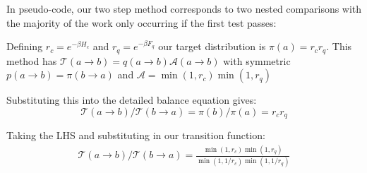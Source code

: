 In pseudo-code, our two step method corresponds to two nested comparisons with the majority of the work only occurring if the first test passes:

\begin{Shaded}
\begin{Highlighting}[]
\OperatorTok{=}

 
\OperatorTok{=}

\OperatorTok{=}
  \NormalTok{,}\NormalTok{) }\OperatorTok{\textless{}}\OperatorTok{{-}}\OperatorTok{*}
\OperatorTok{=}
    \NormalTok{,}\NormalTok{) }\OperatorTok{\textless{}}\OperatorTok{{-}}\OperatorTok{*}
\OperatorTok{=}

\OperatorTok{=}
\end{Highlighting}
\end{Shaded}

Defining \(r_c = e^{-\beta H_c}\) and \(r_q = e^{-\beta F_q}\) our target distribution is \(\pi(a) = r_c r_q\). This method has \(\mathcal{T}(a\to b) = q(a\to b)\mathcal{A}(a \to b)\) with symmetric \(p(a \to b) = \pi(b \to a)\) and \(\mathcal{A} = \min\left(1, r_c\right) \min\left(1, r_q\right)\)

Substituting this into the detailed balance equation gives: \[\mathcal{T}(a \to b)/\mathcal{T}(b \to a) = \pi(b)/\pi(a) = r_c r_q\]

Taking the LHS and substituting in our transition function: \[\begin{aligned}
\mathcal{T}(a \to b)/\mathcal{T}(b \to a) = \frac{\min\left(1, r_c\right) \min\left(1, r_q\right)}{ \min\left(1, 1/r_c\right) \min\left(1, 1/r_q\right)}\end{aligned}\]

